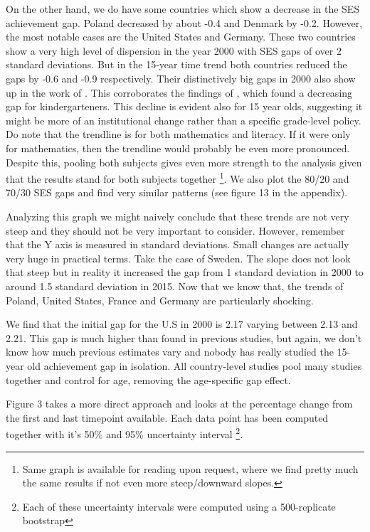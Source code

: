 \documentclass[11pt, a4paper]{article}\usepackage[]{graphicx}\usepackage[]{color}
\begin{document}
On the other hand, we do have some countries which show a decrease in the SES achievement gap. Poland decreased by about -0.4 and Denmark by -0.2. However, the most notable cases are the United States and Germany. These two countries show a very high level of dispersion in the year 2000 with SES gaps of over 2 standard deviations. But in the 15-year time trend both countries reduced the gaps by -0.6 and -0.9 respectively. Their distinctively big gaps in 2000 also show up in the work of \citet{micklewright}. This corroborates the findings of \citet{reardon_portilla}, which found a decreasing gap for kindergarteners. This decline is evident also for 15 year olds, suggesting it might be more of an institutional change rather than a specific grade-level policy. Do note that the trendline is for both mathematics and literacy. If it were only for mathematics, then the trendline would probably be even more pronounced. Despite this, pooling both subjects gives even more strength to the analysis given that the results stand for both subjects together \footnote{Same graph is available for reading upon request, where we find pretty much the same results if not even more steep/downward slopes.}. We also plot the 80/20 and 70/30 SES gaps and find very similar patterns (see figure 13 in the appendix).

Analyzing this graph we might naively conclude that these trends are not very steep and they should not be very important to consider. However, remember that the Y axis is measured in standard deviations. Small changes are actually very huge in practical terms. Take the case of Sweden. The slope does not look that steep but in reality it increased the gap from 1 standard deviation in 2000 to around 1.5 standard deviation in 2015. Now that we know that, the trends of Poland, United States, France and Germany are particularly shocking.



We find that the initial gap for the U.S in 2000 is 2.17 varying between 2.13 and 2.21. This gap is much higher than found in previous studies, but again, we don't know how much previous estimates vary and nobody has really studied the 15-year old achievement gap in isolation. All country-level studies pool many studies together and control for age, removing the age-specific gap effect.

Figure 3 takes a more direct approach and looks at the percentage change from the first and last timepoint available. Each data point has been computed together with it's 50\% and 95\% uncertainty interval \footnote{Each of these uncertainty intervals were computed using a 500-replicate bootstrap}.
\end{document}
